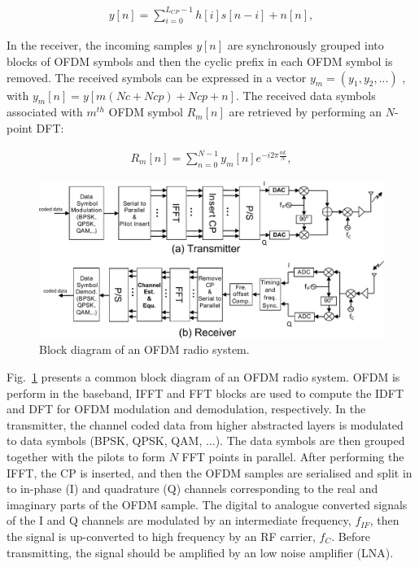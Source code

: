 \begin{eqnarray}
\label{equ:OFDMchannelsignal}
y[n] =  \sum_{i=0}^{L_{CP}-1} h[i]s[n-i] + n[n],
\end{eqnarray}

In the receiver, the incoming samples $y[n]$ are synchronously grouped into blocks of OFDM symbols and then the cyclic prefix in each OFDM symbol is removed.
The received symbols can be expressed in a vector $y_{m} = (y_{1}, y_{2}, . . . )$ , with $y_{m}[n]=y[m(Nc+Ncp)+Ncp +n]$.
The received data symbols associated with $m^{th}$ OFDM symbol $R_{m}[n]$ are retrieved by performing an $N$-point DFT:

\begin{eqnarray}
\label{equ:receiveOFDMsymbol}
R_{m}[n] =  \sum_{n=0}^{N-1} y_{m}[n]e^{-i2\pi \frac{nk}{N}},
\end{eqnarray}

\begin{figure}
	\centerline{\includegraphics [width=\columnwidth] {Figures/OFDM-block.pdf} }
	\caption{Block diagram of an OFDM radio system.}
	\label{fig:OFDM-block}
\end{figure}

Fig.~\ref{fig:OFDM-block} presents a common block diagram of an OFDM radio system.
OFDM is perform in the baseband, IFFT and FFT blocks are used to compute the IDFT and DFT for OFDM modulation and demodulation, respectively.
In the transmitter, the channel coded data from higher abstracted layers is modulated to data symbols (BPSK, QPSK, QAM, ...). The data symbols are then grouped together with the pilots to form $N$ FFT points in parallel.
After performing the IFFT, the CP is inserted, and then the OFDM samples are serialised and split in to in-phase (I) and quadrature (Q) channels corresponding to the real and imaginary parts of  the OFDM sample.
The digital to analogue converted signals of the I and Q channels are modulated by an intermediate frequency, $f_{IF}$, then the signal is up-converted to high frequency by an RF carrier, $f_{C}$.
Before transmitting, the signal should be amplified by an low noise amplifier (LNA).

